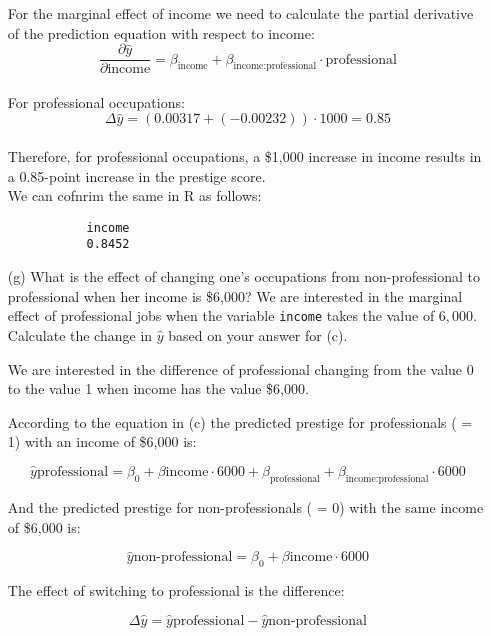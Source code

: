 \documentclass[12pt,letterpaper]{article}
\begin{document}
\begin{enumerate}
	
    For the marginal effect of income we need to calculate the partial derivative of the prediction equation with respect to income: \\
	 $$   \frac{\partial \hat{y}}{\partial \text{income}} = \beta_{\text{income}} + \beta_{\text{income:professional}} \cdot \text{professional}$$ \\
	 For professional occupations: \\
	 $$\Delta \hat{y} = (0.00317 + (-0.00232)) \cdot 1000 = 0.85$$ \\
	 Therefore, for professional occupations, a \$1,000 increase in income results in a 0.85-point  increase in the prestige score. \\
	 
	 We can cofnrim the same in R as follows: 
	 
	 \begin{verbatim}
	 	   income
	 	   0.8452 
	 \end{verbatim}
	 
	 
    
	
	
	\item [(g)]
	What is the effect of changing one's occupations from non-professional to professional when her income is \$6,000? We are interested in the marginal effect of professional jobs when the variable \texttt{income} takes the value of $6,000$. Calculate the change in $\hat{y}$ based on your answer for (c).
	
	We are interested in the difference of professional changing from the value 0 to the value 1 when income has the value \$6,000. 
	
	According to the equation in (c) the predicted prestige for professionals ( = 1) with an income of  \$6,000 is: 

	$$\hat{y}{\text{professional}} = \beta_0 + \beta{\text{income}} \cdot 6000 + \beta_{\text{professional}} + \beta_{\text{income:professional}} \cdot 6000$$
	
	
	And the predicted prestige for non-professionals ( = 0) with the same income of \$6,000 is: 
	
	$$\hat{y}{\text{non-professional}} = \beta_0 + \beta{\text{income}} \cdot 6000$$
	
	The effect of switching to professional is the difference:
	
	
	$$\Delta \hat{y} = \hat{y}{\text{professional}} - \hat{y}{\text{non-professional}}$$
	

\end{enumerate}
\end{document}
